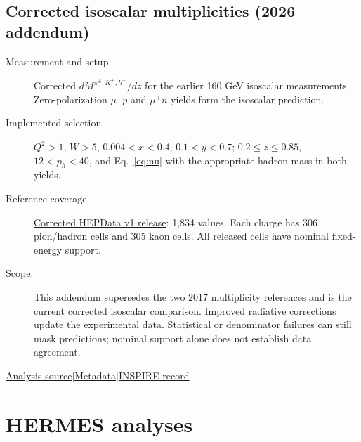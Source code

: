 \documentclass[11pt,a4paper]{article}
\newcommand{\id}[1]{{\small\texttt{\detokenize{#1}}}}
\begin{document}
\subsection{\texorpdfstring{Corrected isoscalar multiplicities (2026 addendum)}{Corrected isoscalar multiplicities (2026 addendum)}}
\id{COMPASS_2026_I3096394}\quad\cite{r3096394}
\begin{description}
\item[Measurement and setup.] Corrected $dM^{\pi^\pm,K^\pm,h^\pm}/dz$ for the earlier 160 GeV isoscalar measurements. Zero-polarization $\mu^+p$ and $\mu^+n$ yields form the isoscalar prediction.
\item[Implemented selection.] $Q^2>1$, $W>5$, $0.004<x<0.4$, $0.1<y<0.7$; $0.2\le z\le0.85$, $12<p_h<40$, and Eq.~\eqref{eq:nu} with the appropriate hadron mass in both yields.
\item[Reference coverage.] \href{https://www.hepdata.net/record/ins3096394?version=1}{Corrected HEPData v1 release}: 1,834 values. Each charge has 306 pion/hadron cells and 305 kaon cells. All released cells have nominal fixed-energy support.
\item[Scope.] This addendum supersedes the two 2017 multiplicity references and is the current corrected isoscalar comparison. Improved radiative corrections update the experimental data. Statistical or denominator failures can still mask predictions; nominal support alone does not establish data agreement.
\end{description}
{\small\href{https://github.com/apapaefs/HerwigPolarizedPheno/blob/105045bd757aaa6b217e87811dc5f9a22a8d1cef/analyses/rivet/dis/COMPASS_2026_I3096394.cc}{Analysis source}\quad|\quad\href{https://github.com/apapaefs/HerwigPolarizedPheno/blob/105045bd757aaa6b217e87811dc5f9a22a8d1cef/analyses/rivet/dis/COMPASS_2026_I3096394.info}{Metadata}\quad|\quad\href{https://inspirehep.net/literature/3096394}{INSPIRE record}}

\clearpage
\section{HERMES analyses}
\end{document}
